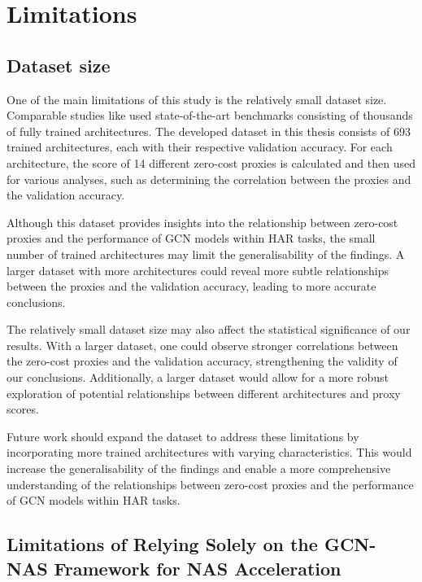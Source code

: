 \section{Limitations}
\subsection{Dataset size}

One of the main limitations of this study is the relatively small dataset size. Comparable studies like \autocite{abdelfattah2021zero, colin2022adeeperlook} used state-of-the-art benchmarks consisting of thousands of fully trained architectures. The developed dataset in this thesis consists of 693 trained architectures, each with their respective validation accuracy. For each architecture, the score of 14 different zero-cost proxies is calculated and then used for various analyses, such as determining the correlation between the proxies and the validation accuracy.

Although this dataset provides insights into the relationship between zero-cost proxies and the performance of \gls{GCN} models within \gls{HAR} tasks, the small number of trained architectures may limit the generalisability of the findings. A larger dataset with more architectures could reveal more subtle relationships between the proxies and the validation accuracy, leading to more accurate conclusions.

The relatively small dataset size may also affect the statistical significance of our results. With a larger dataset, one could observe stronger correlations between the zero-cost proxies and the validation accuracy, strengthening the validity of our conclusions. Additionally, a larger dataset would allow for a more robust exploration of potential relationships between different architectures and proxy scores.

Future work should expand the dataset to address these limitations by incorporating more trained architectures with varying characteristics. This would increase the generalisability of the findings and enable a more comprehensive understanding of the relationships between zero-cost proxies and the performance of \gls{GCN} models within \gls{HAR} tasks.


\subsection{Limitations of Relying Solely on the GCN-NAS Framework for NAS Acceleration}


